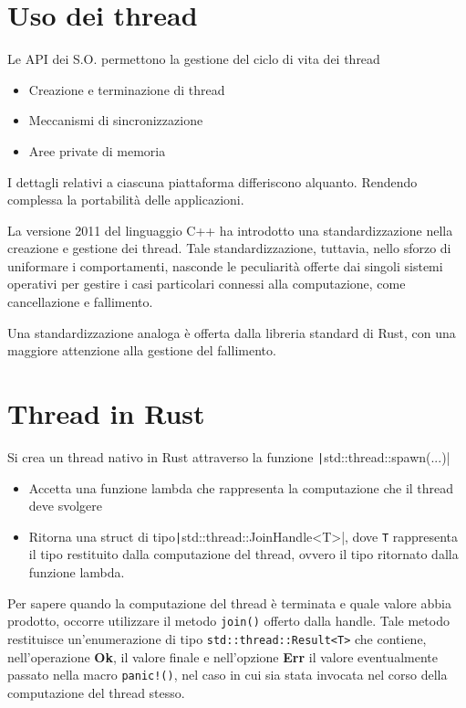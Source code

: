 \section{Uso dei thread}

Le API dei S.O. permettono la gestione del ciclo di vita dei thread

\begin{itemize}
  \item Creazione e terminazione di thread
  \item Meccanismi di sincronizzazione
  \item Aree private di memoria
\end{itemize}

I dettagli relativi a ciascuna piattaforma differiscono alquanto. Rendendo
complessa la portabilità delle applicazioni.

La versione 2011 del linguaggio C++ ha introdotto una standardizzazione nella
creazione e gestione dei thread. Tale standardizzazione, tuttavia, nello sforzo
di uniformare i comportamenti, nasconde le peculiarità offerte dai singoli
sistemi operativi per gestire i casi particolari connessi alla computazione,
come cancellazione e fallimento.

Una standardizzazione analoga è offerta dalla
libreria standard di Rust, con una maggiore attenzione alla gestione del
fallimento.

\section{Thread in Rust}
Si crea un thread nativo in Rust attraverso la funzione \texttt|std::thread::spawn(...)|

\begin{itemize}
  \item Accetta una funzione lambda che rappresenta la computazione che il thread deve svolgere
  \item Ritorna una struct di tipo\texttt|std::thread::JoinHandle<T>|, dove \texttt{T}
        rappresenta il tipo restituito dalla computazione del thread, ovvero il tipo ritornato dalla funzione lambda.
\end{itemize}

Per sapere quando la computazione del thread è terminata e quale valore abbia
prodotto, occorre utilizzare il metodo \verb|join()| offerto dalla handle.
Tale metodo restituisce un'enumerazione di tipo \verb|std::thread::Result<T>| che contiene,
nell'operazione \textbf{Ok}, il valore finale e nell'opzione \textbf{Err} il valore
eventualmente passato nella macro \verb|panic!()|, nel caso in cui sia stata
invocata nel corso della computazione del thread stesso.



